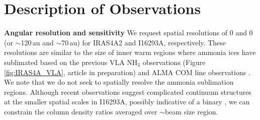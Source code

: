 \documentclass[12pt,a4paper]{article}  %
\begin{document}

%





\section{Description of Observations}\label{sec:desc_obs}

\noindent \textbf{Angular resolution and sensitivity} \quad We request spatial resolutions of 0 and 0 (or $\sim$120\,au and $\sim$70\,au) for IRAS4A2 and I16293A, respectively. These resolutions are similar to the size of inner warm regions where ammonia ices have sublimated based on the previous VLA NH$_3$ observations (Figure \ref{fig:IRAS4A_VLA}, article in preparation) and ALMA COM line observations \citep{Manigand20}. We note that we do not seek to spatially resolve the ammonia sublimation regions. Although recent observations suggest complicated continuum structures at the smaller spatial scales in I16293A, possibly indicative of a binary \citep{Maureira20}, we can constrain the column density ratios averaged over $\sim$beam size region.
\end{document}
